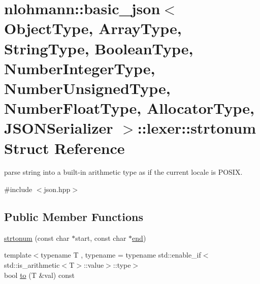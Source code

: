 \hypertarget{structnlohmann_1_1basic__json_1_1lexer_1_1strtonum}{}\section{nlohmann\+:\+:basic\+\_\+json$<$ Object\+Type, Array\+Type, String\+Type, Boolean\+Type, Number\+Integer\+Type, Number\+Unsigned\+Type, Number\+Float\+Type, Allocator\+Type, J\+S\+O\+N\+Serializer $>$\+:\+:lexer\+:\+:strtonum Struct Reference}
\label{structnlohmann_1_1basic__json_1_1lexer_1_1strtonum}


parse string into a built-\/in arithmetic type as if the current locale is P\+O\+S\+IX.  




{\ttfamily \#include $<$json.\+hpp$>$}

\subsection*{Public Member Functions}
\begin{DoxyCompactItemize}
\item 
\hyperlink{structnlohmann_1_1basic__json_1_1lexer_1_1strtonum_ae065098e24b08ea79a359950190006d8}{strtonum} (const char $\ast$start, const char $\ast$\hyperlink{classnlohmann_1_1basic__json_a13e032a02a7fd8a93fdddc2fcbc4763c}{end})
\item 
{\footnotesize template$<$typename T , typename  = typename std\+::enable\+\_\+if$<$std\+::is\+\_\+arithmetic$<$\+T$>$\+::value$>$\+::type$>$ }\\bool \hyperlink{structnlohmann_1_1basic__json_1_1lexer_1_1strtonum_af1b3dc99a67a854750437a60a22f4989}{to} (T \&val) const
\end{DoxyCompactItemize}
